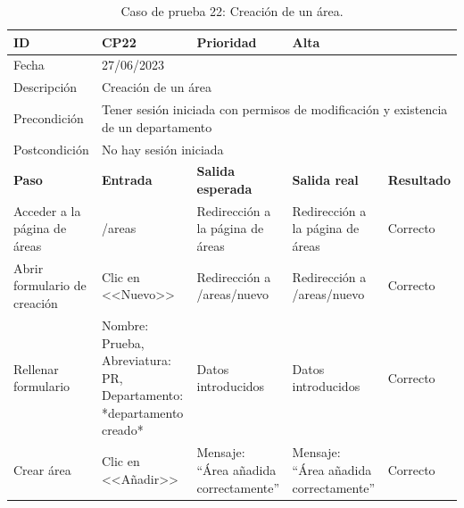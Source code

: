 \begin{table}[H]
\small
\begin{tabular}{p{} p{} p{} p{} p{}}
\cellcolor{gray!25}
ID   & CP22 & \cellcolor{gray!25} Prioridad   & Alta \\ \hline
\cellcolor{gray!25} Fecha	&	\multicolumn{4}{l}{27/06/2023} \\ \hline
\cellcolor{gray!25} Descripción		&	\multicolumn{4}{l}{Creación de un área} \\ \hline                                            
\cellcolor{gray!25}
Precondición  & \multicolumn{4}{p{.66\textwidth}}{Tener sesión iniciada con permisos de modificación y existencia de un departamento} \\ \hline
\cellcolor{gray!25} Postcondición & \multicolumn{4}{l}{No hay sesión iniciada}                                                    \\ \hline
\rowcolor{gray!25}
\textbf{Paso}   & \textbf{Entrada} & \textbf{Salida esperada} & \textbf{Salida real} & \textbf{Resultado} \\ \hline
Acceder a la página de áreas
& /areas                                                                          
& Redirección a la página de áreas
& Redirección a la página de áreas
& Correcto                            
\\ \hline
Abrir formulario de creación
& Clic en <<Nuevo>>
& Redirección a /areas/nuevo
& Redirección a /areas/nuevo
& Correcto
\\ \hline
Rellenar formulario
& Nombre: Prueba, Abreviatura: PR, Departamento: *departamento creado*
& Datos introducidos                     
& Datos introducidos 
& Correcto                            
\\ \hline  
Crear área
& Clic en <<Añadir>>
& Mensaje: ``Área añadida correctamente''                     
& Mensaje: ``Área añadida correctamente''  
& Correcto                            
\\ \hline              
\end{tabular}
\caption{Caso de prueba 22: Creación de un área.}\label{table:CP22}
\end{table}

